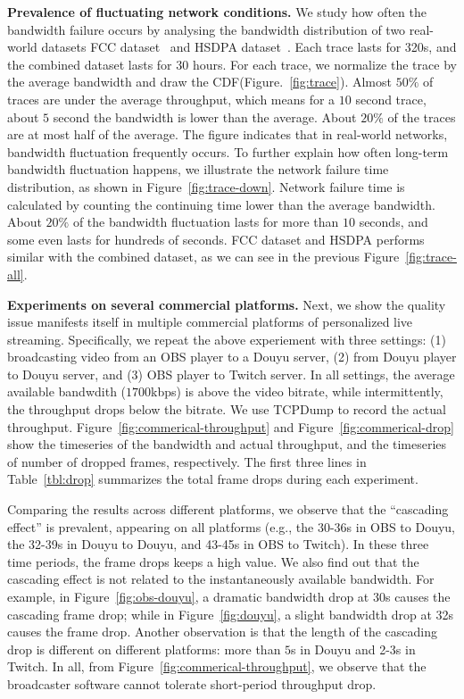 
\textbf{Prevalence of fluctuating network conditions.} We study how often the bandwidth failure occurs by analysing the bandwidth distribution of two real-world datasets \textemdash\xspace FCC dataset~\cite{FCC_dataset} and HSDPA dataset~\cite{HSDPA_dataset}. Each trace lasts for 320s, and the combined dataset lasts for $30$ hours. For each trace, we normalize the trace by the average bandwidth and draw the CDF(Figure.~\ref{fig:trace}). Almost $50\%$ of traces are under the average throughput, which means for a $10$ second trace, about $5$ second the bandwidth is lower than the average. About $20\%$ of the traces are at most half of the average. The figure indicates that in real-world networks, bandwidth fluctuation frequently occurs. To further explain how often long-term bandwidth fluctuation happens, we illustrate the network failure time distribution, as shown in Figure~\ref{fig:trace-down}. Network failure time is calculated by counting the continuing time lower than the average bandwidth. About $20\%$ of the bandwidth fluctuation lasts for more than $10$ seconds, and some even lasts for hundreds of seconds. FCC dataset and HSDPA performs similar with the combined dataset, as we can see in the previous Figure~\ref{fig:trace-all}.


\textbf{Experiments on several commercial platforms.}
Next, we show the quality issue manifests itself in multiple
commercial platforms of personalized live streaming. Specifically, we
repeat the above experiement with three settings: (1) broadcasting
video from an OBS player to a Douyu server, (2) from Douyu player to
Douyu server, and (3) OBS player to Twitch server. In all settings,
the average available bandwdith ($1700$kbps) is above the video
bitrate, while intermittently, the throughput drops below the
bitrate. We use TCPDump to record the actual throughput.
Figure~\ref{fig:commerical-throughput} and
Figure~\ref{fig:commerical-drop} show the timeseries of the
bandwidth and actual throughput, and the timeseries of number of
dropped frames, respectively. The first three lines in
Table~\ref{tbl:drop} summarizes the total frame drops during each
experiment.

Comparing the results across different platforms, we observe that the ``cascading effect'' is prevalent, appearing on all platforms (e.g., the 30-36s in OBS to Douyu, the 32-39s in Douyu to Douyu, and 43-45s in OBS to Twitch). In these three time periods, the frame drops keeps a high value. We also find out that the cascading effect is not related to the instantaneously available bandwidth. For example, in Figure~\ref{fig:obs-douyu}, a dramatic bandwidth drop at 30s causes the cascading frame drop; while in Figure~\ref{fig:douyu}, a slight bandwidth drop at 32s causes the frame drop. Another observation is that the length of the cascading drop is different on different platforms: more than $5$s in Douyu and 2-3s in Twitch. In all, from Figure~\ref{fig:commerical-throughput}, we observe that the broadcaster software cannot tolerate short-period throughput drop.

